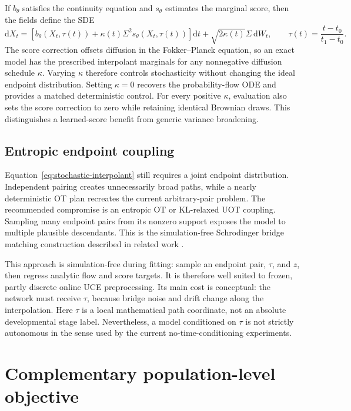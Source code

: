 \documentclass[11pt]{article}
\newcommand{\uce}{UCE}
\newcommand{\dd}{\mathrm{d}}
\begin{document}
If $b_\theta$ satisfies the continuity equation and $s_\theta$ estimates the
marginal score, then the fields define the SDE
\begin{equation}
  \dd X_t
  = \left[
      b_\theta(X_t,\tau(t))
      + \kappa(t)\Sigma^2s_\theta(X_t,\tau(t))
    \right]\dd t
    + \sqrt{2\kappa(t)}\Sigma\,\dd W_t,
  \qquad \tau(t)=\frac{t-t_0}{t_1-t_0}.
  \label{eq:score-flow-sde}
\end{equation}
The score correction offsets diffusion in the Fokker--Planck equation, so an
exact model has the prescribed interpolant marginals for any nonnegative
diffusion schedule $\kappa$. Varying $\kappa$ therefore controls stochasticity
without changing the ideal endpoint distribution. Setting $\kappa=0$ recovers
the probability-flow ODE and provides a matched deterministic control.
For every positive $\kappa$, evaluation also sets the score correction to zero
while retaining identical Brownian draws. This distinguishes a learned-score
benefit from generic variance broadening.

\subsection{Entropic endpoint coupling}

Equation~\ref{eq:stochastic-interpolant} still requires a joint endpoint
distribution. Independent pairing creates unnecessarily broad paths, while a
nearly deterministic OT plan recreates the current arbitrary-pair problem. The
recommended compromise is an entropic OT or KL-relaxed UOT coupling. Sampling
many endpoint pairs from its nonzero support exposes the model to multiple
plausible descendants. This is the simulation-free Schrodinger bridge matching
construction described in related work
\cite{albergo2023stochastic,tong2024simulationfree}.

This approach is simulation-free during fitting: sample an endpoint pair,
$\tau$, and $z$, then regress analytic flow and score targets. It is therefore
well suited to frozen, partly discrete online \uce{} preprocessing. Its main
cost is conceptual: the network must receive $\tau$, because bridge noise and
drift change along the interpolation. Here $\tau$ is a local mathematical path
coordinate, not an absolute developmental stage label. Nevertheless, a model
conditioned on $\tau$ is not strictly autonomous in the sense used by the
current no-time-conditioning experiments.

\section{Complementary population-level objective}
\end{document}
